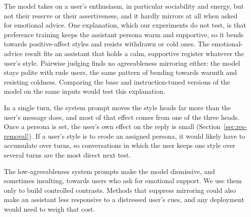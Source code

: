 The model takes on a user's enthusiasm, in particular sociability and energy, but not their reserve or their assertiveness, and it hardly mirrors at all when asked for emotional advice. One explanation, which our experiments do not test, is that preference training keeps the assistant persona warm and supportive, so it bends towards positive-affect styles and resists withdrawn or cold ones. The emotional-advice result fits an assistant that holds a calm, supportive register whatever the user's style. Pairwise judging finds no agreeableness mirroring either: the model stays polite with rude users, the same pattern of bending towards warmth and resisting coldness. Comparing the base and instruction-tuned versions of the model on the same inputs would test this explanation.

In a single turn, the system prompt moves the style heads far more than the user's message does, and most of that effect comes from one of the three heads. Once a persona is set, the user's own effect on the reply is small (Section~\ref{sec:res-removal}). If a user's style is to erode an assigned persona, it would likely have to accumulate over turns, so conversations in which the user keeps one style over several turns are the most direct next test.

The low-agreeableness system prompts make the model dismissive, and sometimes insulting, towards users who ask for emotional support. We use them only to build controlled contrasts. Methods that suppress mirroring could also make an assistant less responsive to a distressed user's cues, and any deployment would need to weigh that cost.
